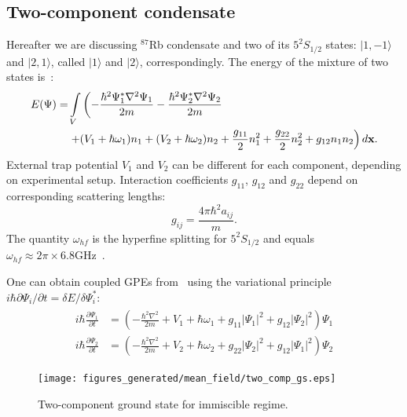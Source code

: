 \subsection{Two-component condensate}

Hereafter we are discussing $^{87}$Rb condensate and two of its $5^2S_{1/2}$ states: $\vert1,-1\rangle$ and $\vert2,1\rangle$,
called $\vert1\rangle$ and $\vert2\rangle$, correspondingly.
The energy of the mixture of two states is~\cite{Pitaevskii2003}:
\begin{equation}
\label{eqn:mean-field:two-comp-energy}
\begin{split}
	E(\Psi) = & \int\limits_V \left(
		- \frac{\hbar^2 \Psi_1^* \nabla^2 \Psi_1}{2m}
		- \frac{\hbar^2 \Psi_2^* \nabla^2 \Psi_2}{2m}
	\right. \\
	& \left.
		+ (V_1 + \hbar \omega_1) n_1 + (V_2 + \hbar \omega_2) n_2
		+ \frac{g_{11}}{2} n_1^2 + \frac{g_{22}}{2} n_2^2 + g_{12} n_1 n_2
	\right) d\mathbf{x}.
\end{split}
\end{equation}
External trap potential $V_1$ and $V_2$ can be different for each component, depending on experimental setup.
Interaction coefficients $g_{11}$, $g_{12}$ and $g_{22}$ depend on corresponding scattering lengths:
\[
	g_{ij} = \frac{4 \pi \hbar^2 a_{ij}}{m}.
\]
The quantity $\omega_{hf}$ is the hyperfine splitting for $5^2S_{1/2}$ and equals
$\omega_{hf} \approx 2 \pi \times 6.8 \textrm{GHz}$~\cite{Steck2009}.

One can obtain coupled GPEs from~ using the variational principle $i \hbar \partial \Psi_i / \partial t = \delta E / \delta \Psi_i^*$:
\begin{align}
\label{eqn:mean-field:two-comp-cgpes}
\begin{split}
	i \hbar \frac{\partial \Psi_1}{\partial t} & = \left(
		-\frac{\hbar^2 \nabla^2}{2 m} + V_1 + \hbar \omega_1
		+ g_{11} \lvert \Psi_1 \rvert^2 + g_{12} \lvert \Psi_2 \rvert^2
	\right) \Psi_1 \\
	i \hbar \frac{\partial \Psi_2}{\partial t} & = \left(
		-\frac{\hbar^2 \nabla^2}{2 m} + V_2 + \hbar \omega_2
		+ g_{22} \lvert \Psi_2 \rvert^2 + g_{12} \lvert \Psi_1 \rvert^2
	\right) \Psi_2
\end{split}
\end{align}

\begin{figure}
\begin{center}
\texttt{[image: figures\_generated/mean\_field/two\_comp\_gs.eps]}
\caption{Two-component ground state for immiscible regime.}
\label{fig:mean-field:two-comp-gs}
\end{center}
\end{figure}

